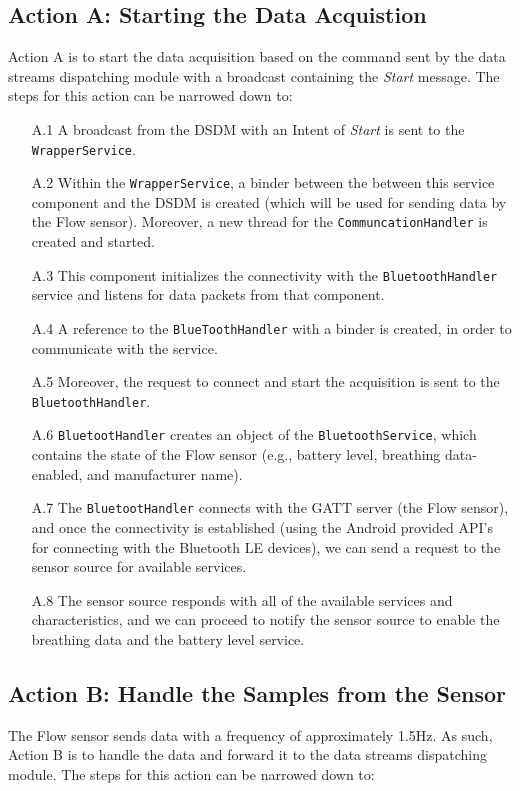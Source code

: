 \subsection{Action A: Starting the Data Acquistion}
Action A is to start the data acquisition based on the command sent by the data streams dispatching module with a broadcast containing the \textit{Start} message. The steps for this action can be narrowed down to:

\begin{itemize}
    \item[A.1] A broadcast from the DSDM with an Intent of \textit{Start} is sent to the \verb|WrapperService|.
    \item[A.2] Within the \verb|WrapperService|, a binder between the between this service component and the DSDM is created (which will be used for sending data by the Flow sensor). Moreover, a new thread for the \verb|CommuncationHandler| is created and started.
    \item[A.3] This component initializes the connectivity with the \verb|BluetoothHandler| service and listens for data packets from that component.
    \item[A.4] A reference to the \verb|BlueToothHandler| with a binder is created, in order to communicate with the service. 
    \item[A.5] Moreover, the request to connect and start the acquisition is sent to the \verb|BluetoothHandler|. 
    \item[A.6] \verb|BluetootHandler| creates an object of the \verb|BluetoothService|, which contains the state of the Flow sensor (e.g., battery level, breathing data-enabled, and manufacturer name). 
    \item[A.7] The \verb|BluetootHandler| connects with the GATT server (the Flow sensor), and once the connectivity is established (using the Android provided API's for connecting with the Bluetooth LE devices), we can send a request to the sensor source for available services. 
    \item[A.8] The sensor source responds with all of the available services and characteristics, and we can proceed to notify the sensor source to enable the breathing data and the battery level service.  
\end{itemize}


\subsection{Action B: Handle the Samples from the Sensor}
The Flow sensor sends data with a frequency of approximately 1.5Hz. As such, Action B is to handle the data and forward it to the data streams dispatching module. The steps for this action can be narrowed down to:

